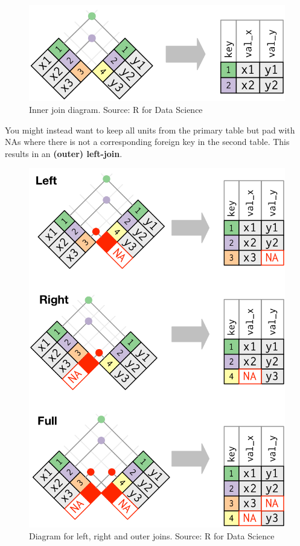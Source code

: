 \documentclass[
  12pt,
]{book}
\begin{document}
\begin{figure}
\centering
\includegraphics{images/301-edav-wrangling/join-inner.png}
\caption{Inner join diagram. Source: R for Data Science}
\end{figure}

You might instead want to keep all units from the primary table but pad with NAs where there is not a corresponding foreign key in the second table. This results in an \textbf{(outer) left-join}.

\begin{figure}
\centering
\includegraphics{images/301-edav-wrangling/join-left-right-full.png}
\caption{Diagram for left, right and outer joins. Source: R for Data Science}
\end{figure}
\end{document}
